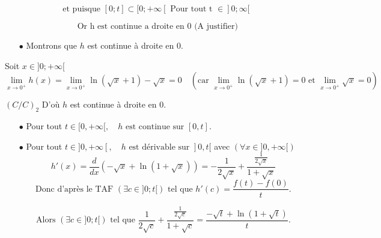 \documentclass{article}
\begin{document}
\[
\text {et puisque } [0 ; t] \subset [0;+\infty[ \text{ Pour tout t } \in ]0;\infty[
\]

\[
\text { Or h est continue a droite en 0 (A justifier)}
\] 

\begin{itemize}
    \item[\(\bullet\)] Montrons que \( h \) est continue à droite en 0.
\end{itemize}

Soit \(x \in ] 0; +\infty [\)
\[
\lim_{x \to 0^+ } h(x) = \lim_{x \to 0^+ } \ln (\sqrt {x} + 1 ) - \sqrt{x} = 0 \quad (\text{car } \lim_{x \to 0^+ } \ln (\sqrt {x} + 1 ) = 0 \text{ et } \lim_{x \to 0^+ } \sqrt{x} = 0)
\]

\((C/C)_{2}\) D'où \( h \) est continue à droite en 0.

\hrulefill %
 

\begin{itemize}
    \item[$\bullet$] Pour tout \( t \in [0, +\infty[, \quad h \text{ est continue sur } [0, t]\).
    
    \item[$\bullet$] Pour tout \( t \in ]0, +\infty[, \quad h \text{ est dérivable sur } ]0, t[ \) avec \( (\forall x \in ]0, +\infty[) \)
    \[
    h'(x) = \frac{d}{dx} \left( -\sqrt{x} + \ln(1 + \sqrt{x}) \right) = -\frac{1}{2\sqrt{x}} + \frac{\frac{1}{2\sqrt{x}}}{1 + \sqrt{x}}
    \]
    \[\text{Donc d'après le TAF }(\exists c \in ]0;t[) \text{ tel que } h'(c)= \frac{f(t)-f(0)}{t}. \]
    
 \[\text{Alors } (\exists c \in ]0;t[) \text{ tel que } \frac{1}{2\sqrt{c}} + \frac{\frac{1}{2\sqrt{c}}}{1 + \sqrt{c}} = \frac{-\sqrt{t} + \ln(1 + \sqrt{t})}{t}.\]

\end{itemize}
\end{document}
